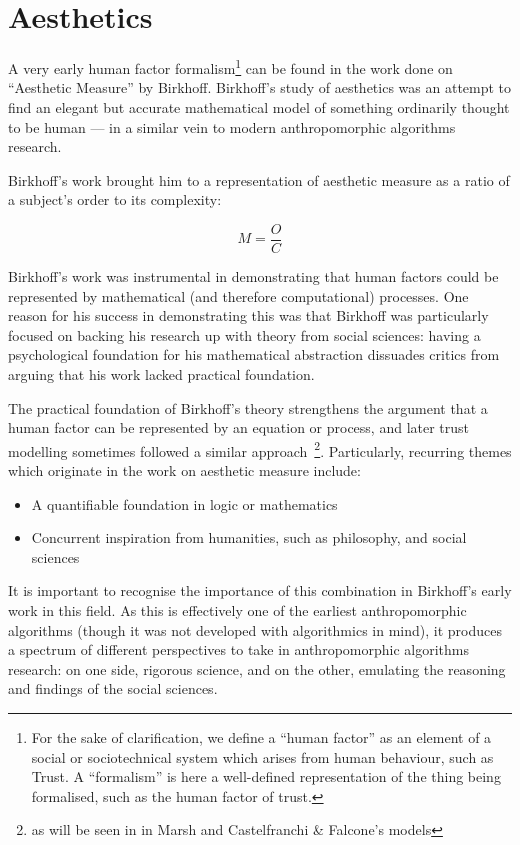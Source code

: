 \documentclass[11pt,english,twocolumn]{article}
\begin{document}
\section{Aesthetics}
A very early human factor formalism\footnote{For the sake of clarification, we define a ``human factor'' as an element of a social or sociotechnical system which arises from human behaviour, such as Trust. A ``formalism'' is here a well-defined representation of the thing being formalised, such as the human factor of trust.} can be found in the work done on ``Aesthetic Measure'' by Birkhoff\cite{Birkhoff1933}. Birkhoff's study of aesthetics was an attempt to find an elegant but accurate mathematical model of something ordinarily thought to be human --- in a similar vein to modern anthropomorphic algorithms research.\par

Birkhoff's work brought him to a representation of aesthetic measure as a ratio of a subject's order to its complexity:

\[M = \frac{O}{C}\]

Birkhoff's work was instrumental in demonstrating that human factors could be represented by mathematical (and therefore computational) processes. One reason for his success in demonstrating this was that Birkhoff was particularly focused on backing his research up with theory from social sciences: having a psychological foundation for his mathematical abstraction dissuades critics from arguing that his work lacked practical foundation. \par

The practical foundation of Birkhoff's theory strengthens the argument that a human factor can be represented by an equation or process, and later trust modelling sometimes followed a similar approach~\footnote{as will be seen in in Marsh\cite{Marsh1994} and Castelfranchi \& Falcone\cite{Castelfranchi2001}'s models}. Particularly, recurring themes which originate in the work on aesthetic measure include:

\begin{itemize}
    \item A quantifiable foundation in logic or mathematics
    \item Concurrent inspiration from humanities, such as philosophy, and social sciences
\end{itemize}\par

It is important to recognise the importance of this combination in Birkhoff's early work in this field. As this is effectively one of the earliest anthropomorphic algorithms (though it was not developed with algorithmics in mind), it produces a spectrum of different perspectives to take in anthropomorphic algorithms research: on one side, rigorous science, and on the other, emulating the reasoning and findings of the social sciences.\par
\end{document}
